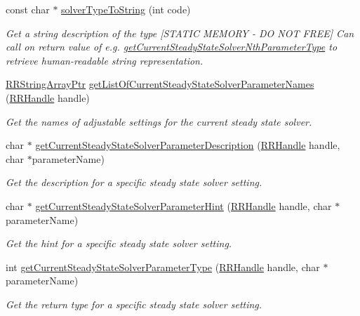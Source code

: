 \begin{DoxyCompactItemize}
const char $\ast$ \hyperlink{group__simopts_ga756168c1c856360e327f017ac7578333}{solver\+Type\+To\+String} (int code)
\begin{DoxyCompactList}\small\item\em Get a string description of the type \mbox{[}S\+T\+A\+T\+I\+C M\+E\+M\+O\+R\+Y -\/ D\+O N\+O\+T F\+R\+E\+E\mbox{]}  Can call on return value of e.\+g. \hyperlink{group__simopts_ga77dcaf609de8b7c9ff829e26f02695b0}{get\+Current\+Steady\+State\+Solver\+Nth\+Parameter\+Type} to retrieve human-\/readable string representation. \end{DoxyCompactList}\item 
\hyperlink{rrc__types_8h_a7c9475df6c7337d99482b13a365e7596}{R\+R\+String\+Array\+Ptr} \hyperlink{group__simopts_gaab9cc86032339b6275487ca0be59b853}{get\+List\+Of\+Current\+Steady\+State\+Solver\+Parameter\+Names} (\hyperlink{rrc__types_8h_a1d68f0592372208fa5a5f2799ea4b3ae}{R\+R\+Handle} handle)
\begin{DoxyCompactList}\small\item\em Get the names of adjustable settings for the current steady state solver. \end{DoxyCompactList}\item 
char $\ast$ \hyperlink{group__simopts_ga4e00e2cbee01bc5b91c0ae6cfb454b75}{get\+Current\+Steady\+State\+Solver\+Parameter\+Description} (\hyperlink{rrc__types_8h_a1d68f0592372208fa5a5f2799ea4b3ae}{R\+R\+Handle} handle, char $\ast$parameter\+Name)
\begin{DoxyCompactList}\small\item\em Get the description for a specific steady state solver setting. \end{DoxyCompactList}\item 
char $\ast$ \hyperlink{group__simopts_gae754a6adb94adcc4ff2f653f8f10c273}{get\+Current\+Steady\+State\+Solver\+Parameter\+Hint} (\hyperlink{rrc__types_8h_a1d68f0592372208fa5a5f2799ea4b3ae}{R\+R\+Handle} handle, char $\ast$parameter\+Name)
\begin{DoxyCompactList}\small\item\em Get the hint for a specific steady state solver setting. \end{DoxyCompactList}\item 
int \hyperlink{group__simopts_ga56bede07a54dfef6e610f231a794b8bf}{get\+Current\+Steady\+State\+Solver\+Parameter\+Type} (\hyperlink{rrc__types_8h_a1d68f0592372208fa5a5f2799ea4b3ae}{R\+R\+Handle} handle, char $\ast$parameter\+Name)
\begin{DoxyCompactList}\small\item\em Get the return type for a specific steady state solver setting. \end{DoxyCompactList}\item 

\end{DoxyCompactItemize}
